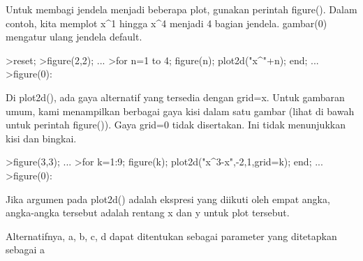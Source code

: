 \documentclass{article}
\begin{document}
\begin{eulernotebook}
\begin{eulercomment}
\begin{eulercomment}
\begin{eulercomment}
\begin{eulercomment}
\begin{eulercomment}
Untuk membagi jendela menjadi beberapa plot, gunakan perintah
figure(). Dalam contoh, kita memplot x\textasciicircum{}1 hingga x\textasciicircum{}4 menjadi 4 bagian
jendela. gambar(0) mengatur ulang jendela default.
\end{eulercomment}
\begin{eulerprompt}
>reset;
>figure(2,2); ...
>for n=1 to 4; figure(n); plot2d("x^"+n); end; ...
>figure(0):
\end{eulerprompt}
\begin{eulercomment}
Di plot2d(), ada gaya alternatif yang tersedia dengan grid=x. Untuk
gambaran umum, kami menampilkan berbagai gaya kisi dalam satu gambar
(lihat di bawah untuk perintah figure()). Gaya grid=0 tidak
disertakan. Ini tidak menunjukkan kisi dan bingkai.
\end{eulercomment}
\begin{eulerprompt}
>figure(3,3); ...
>for k=1:9; figure(k); plot2d("x^3-x",-2,1,grid=k); end; ...
>figure(0):
\end{eulerprompt}
\begin{eulercomment}
Jika argumen pada plot2d() adalah ekspresi yang diikuti oleh empat
angka, angka-angka tersebut adalah rentang x dan y untuk plot
tersebut.

Alternatifnya, a, b, c, d dapat ditentukan sebagai parameter yang
ditetapkan sebagai a


\end{eulercomment}
\end{eulercomment}
\end{eulercomment}
\end{eulercomment}
\end{eulercomment}
\end{eulernotebook}
\end{document}
